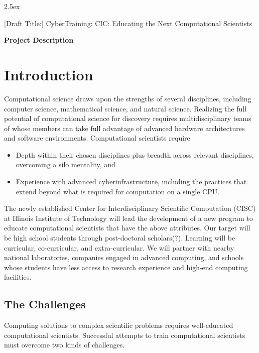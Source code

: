 \documentclass[11pt]{NSFamsart}
\begin{document}
\leftmargini2.5ex %

[Draft Title:]  	CyberTraining: CIC:  Educating the Next Computational Scientists

\bigskip

\centerline{\Large \textbf{Project Description}}
\vspace{-2ex}

\setcounter{tocdepth}{1}
\tableofcontents %

\vspace{-6ex}

\section{Introduction}
Computational science draws upon the strengths of several disciplines, including computer science, mathematical science, and natural science.  Realizing the full potential of computational science for discovery requires multidisciplinary teams of whose members can take full advantage of advanced hardware architectures and software environments.  Computational scientists require

\begin{itemize}
\item Depth within their chosen disciplines plus breadth across relevant disciplines, overcoming a silo mentality, and
\item Experience with advanced cyberinfrastructure, including the practices that extend beyond what is required for computation on a single CPU.
\end{itemize}

The newly established Center for Interdisciplinary Scientific Computation (CISC) at Illinois Institute of Technology will lead the development of a new program to educate computational scientists that have the above attributes.  Our target will be high school students through post-doctoral scholars(?).  Learning will be curricular, co-curricular, and extra-curricular.  We will partner with nearby national laboratories, companies engaged in advanced computing, and schools whose students have less access to research experience and high-end computing facilities.

\subsection*{The Challenges}
Computing solutions to complex scientific problems requires well-educated computational scientists.  Successful attempts to train computational scientists must overcome two kinds of challenges.
\end{document}
